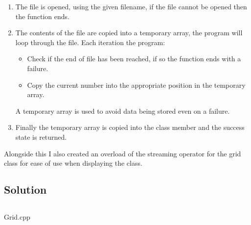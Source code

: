         \begin{enumerate}
            \item The file is opened, using the given filename, 
                if the file cannot be opened then the function ends.

            \item The contents of the file are copied into a temporary array, 
                the program will loop through the file. Each iteration the program:
                \begin{itemize}
                    \item Check if the end of file has been reached, 
                        if so the function ends with a failure.

                    \item Copy the current number into the appropriate position in the temporary array.
                \end{itemize}
                A temporary array is used to avoid data being stored even on a failure.
                
            \item Finally the temporary array is copied into the class member and the success state is returned.
        \end{enumerate}

        Alongside this I also created an overload of the streaming operator for the grid
        class for ease of use when displaying the class.

    \subsection*{Solution}

        \begin{listing}[H]
            \inputminted[firstline=14]{cpp}{../Tasks/02-Reading/Grid.cpp}
            \caption{Grid.cpp}
        \end{listing}